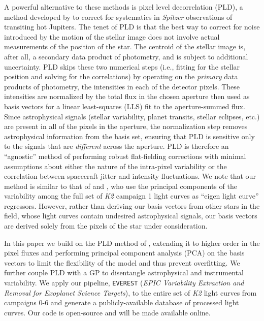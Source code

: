 \documentclass[]{emulateapj}
\begin{document}
A powerful alternative to these methods is pixel level decorrelation (PLD), a method developed
by \cite{DEM15} to correct for systematics in \emph{Spitzer} observations of transiting
hot Jupiters. The tenet of PLD is that the best way to correct for noise introduced by
the motion of the stellar image does not involve actual measurements of the position
of the star. The centroid of the stellar image is, after all, a secondary data product
of photometry, and is subject to additional uncertainty.
PLD skips these two numerical steps (i.e., fitting for the stellar position and solving
for the correlations) by operating on the \emph{primary} data products of photometry, the
intensities in each of the detector pixels. 
These intensities are normalized by the
total flux in the chosen aperture then used as basis vectors for a linear least-squares 
(LLS) fit to the aperture-summed flux. Since astrophysical signals (stellar variability,
planet transits, stellar eclipses, etc.) are present in all of the pixels in the aperture,
the normalization step removes astrophysical information from the basis set, ensuring
that PLD is sensitive only to the signals that are \emph{different} across the aperture. PLD is
therefore an ``agnostic'' method of performing robust flat-fielding corrections with
minimal assumptions about either the nature of the intra-pixel variability or the correlation 
between spacecraft jitter and intensity fluctuations. We note that our method is similar 
to that of \cite{DFM15} and \cite{MON15}, who use the principal components of the variability 
among the full set of \emph{K2} campaign 1 light curves as ``eigen light curve'' regressors.
However, rather than deriving our basis vectors from other stars in the field, whose
light curves contain undesired astrophysical signals, our basis vectors are derived
solely from the pixels of the star under consideration.

In this paper we build on the PLD method of \cite{DEM15}, extending it to higher order
in the pixel fluxes and performing principal component analysis (PCA) on the basis
vectors to limit the flexibility of the model and thus prevent overfitting. We further 
couple PLD with a GP to 
disentangle astrophysical and instrumental variability. 
%
%
%
We apply our pipeline, \texttt{EVEREST}
(\emph{EPIC Variability Extraction and Removal for
Exoplanet Science Targets}), to the entire set of \emph{K2} light curves from campaigns 0-6 and generate a 
publicly-available database of processed light curves. Our code is open-source and will be made
available online.
\end{document}
